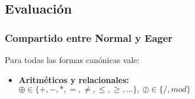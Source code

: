   \subsection{Evaluación}
    \subsubsection{Compartido entre Normal y Eager}
      \PN Para todas las formas canónicas vale: 
      \begin{itemize}
        \item \textbf{Aritméticos y relacionales:} $\oplus\in \{+,-,*,=,\neq,\leq,\geq,...\}, \ \oslash \in \{/, mod\}$
        \begin{itemize}
          \setlength{\columnsep}{.0cm}
\end{itemize}
\end{itemize}
